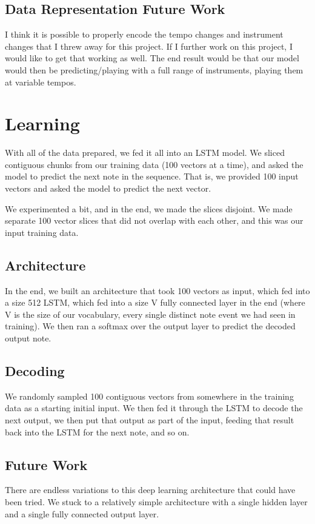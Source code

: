 \documentclass[12pt]{article}
\begin{document}
\subsection{Data Representation Future Work}
I think it is possible to properly encode the tempo changes and instrument changes that I threw away for this project. If I further work on this project, I would like to get that working as well. The end result would be that our model would then be predicting/playing with a full range of instruments, playing them at variable tempos.

\section{Learning}
With all of the data prepared, we fed it all into an LSTM model. We sliced contiguous chunks from our training data (100 vectors at a time), and asked the model to predict the next note in the sequence. That is, we provided 100 input vectors and asked the model to predict the next vector.

We experimented a bit, and in the end, we made the slices disjoint. We made separate 100 vector slices that did not overlap with each other, and this was our input training data.

\subsection{Architecture}
In the end, we built an architecture that took 100 vectors as input, which fed into a size 512 LSTM, which fed into a size V fully connected layer in the end (where V is the size of our vocabulary, every single distinct note event we had seen in training). We then ran a softmax over the output layer to predict the decoded output note.

\subsection{Decoding}
We randomly sampled 100 contiguous vectors from somewhere in the training data as a starting initial input. We then fed it through the LSTM to decode the next output, we then put that output as part of the input, feeding that result back into the  LSTM for the next note, and so on.

\subsection{Future Work}
There are endless variations to this deep learning architecture that could have been tried. We stuck to a relatively simple architecture with a single hidden layer and a single fully connected output layer.
\end{document}
